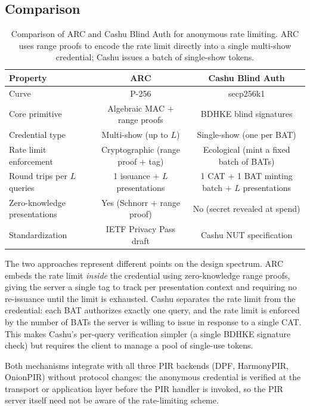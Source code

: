 \subsection{Comparison}

\begin{table}[htbp]
\centering
\begin{tabular}{|l|c|c|}
\hline
\textbf{Property} & \textbf{ARC} & \textbf{Cashu Blind Auth} \\
\hline
Curve & P-256 & secp256k1 \\
Core primitive & Algebraic MAC + range proofs & BDHKE blind signatures \\
Credential type & Multi-show (up to $L$) & Single-show (one per BAT) \\
Rate limit enforcement & Cryptographic (range proof $+$ tag) & Ecological (mint a fixed batch of BATs) \\
Round trips per $L$ queries & 1 issuance $+$ $L$ presentations & 1 CAT $+$ 1 BAT minting batch $+$ $L$ presentations \\
Zero-knowledge presentations & Yes (Schnorr $+$ range proof) & No (secret revealed at spend) \\
Standardization & IETF Privacy Pass draft & Cashu NUT specification \\
\hline
\end{tabular}
\caption{Comparison of ARC and Cashu Blind Auth for anonymous rate limiting. ARC uses range proofs to encode the rate limit directly into a single multi-show credential; Cashu issues a batch of single-show tokens.}
\label{tab:ratelimit-comparison}
\end{table}

The two approaches represent different points on the design spectrum. ARC embeds the rate limit \emph{inside} the credential using zero-knowledge range proofs, giving the server a single tag to track per presentation context and requiring no re-issuance until the limit is exhausted. Cashu separates the rate limit from the credential: each BAT authorizes exactly one query, and the rate limit is enforced by the number of BATs the server is willing to issue in response to a single CAT. This makes Cashu's per-query verification simpler (a single BDHKE signature check) but requires the client to manage a pool of single-use tokens.

Both mechanisms integrate with all three PIR backends (DPF, HarmonyPIR, OnionPIR) without protocol changes: the anonymous credential is verified at the transport or application layer before the PIR handler is invoked, so the PIR server itself need not be aware of the rate-limiting scheme.
